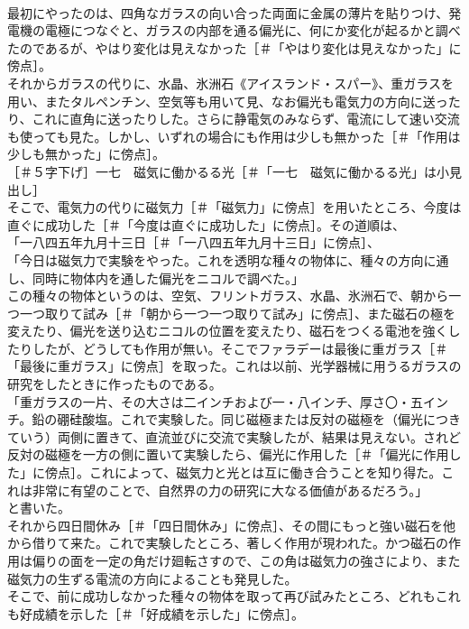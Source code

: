 \documentclass[8pt]{extreport}
\begin{document}
\begin{CJK}{UTF8}{min}
\\	最初にやったのは、四角なガラスの向い合った両面に金属の薄片を貼りつけ、発電機の電極につなぐと、ガラスの内部を通る偏光に、何にか変化が起るかと調べたのであるが、やはり変化は見えなかった［＃「やはり変化は見えなかった」に傍点］。
\\	それからガラスの代りに、水晶、氷洲石《アイスランド・スパー》、重ガラスを用い、またタルペンチン、空気等も用いて見、なお偏光も電気力の方向に送ったり、これに直角に送ったりした。さらに静電気のみならず、電流にして速い交流も使っても見た。しかし、いずれの場合にも作用は少しも無かった［＃「作用は少しも無かった」に傍点］。
\\	［＃５字下げ］一七　磁気に働かるる光［＃「一七　磁気に働かるる光」は小見出し］
\\	そこで、電気力の代りに磁気力［＃「磁気力」に傍点］を用いたところ、今度は直ぐに成功した［＃「今度は直ぐに成功した」に傍点］。その道順は、
\\	「一八四五年九月十三日［＃「一八四五年九月十三日」に傍点］、
\\	「今日は磁気力で実験をやった。これを透明な種々の物体に、種々の方向に通し、同時に物体内を通した偏光をニコルで調べた。」
\\	この種々の物体というのは、空気、フリントガラス、水晶、氷洲石で、朝から一つ一つ取りて試み［＃「朝から一つ一つ取りて試み」に傍点］、また磁石の極を変えたり、偏光を送り込むニコルの位置を変えたり、磁石をつくる電池を強くしたりしたが、どうしても作用が無い。そこでファラデーは最後に重ガラス［＃「最後に重ガラス」に傍点］を取った。これは以前、光学器械に用うるガラスの研究をしたときに作ったものである。
\\	「重ガラスの一片、その大さは二インチおよび一・八インチ、厚さ〇・五インチ。鉛の硼硅酸塩。これで実験した。同じ磁極または反対の磁極を（偏光につきていう）両側に置きて、直流並びに交流で実験したが、結果は見えない。されど反対の磁極を一方の側に置いて実験したら、偏光に作用した［＃「偏光に作用した」に傍点］。これによって、磁気力と光とは互に働き合うことを知り得た。これは非常に有望のことで、自然界の力の研究に大なる価値があるだろう。」
\\	と書いた。
\\	それから四日間休み［＃「四日間休み」に傍点］、その間にもっと強い磁石を他から借りて来た。これで実験したところ、著しく作用が現われた。かつ磁石の作用は偏りの面を一定の角だけ廻転さすので、この角は磁気力の強さにより、また磁気力の生ずる電流の方向によることも発見した。
\\	そこで、前に成功しなかった種々の物体を取って再び試みたところ、どれもこれも好成績を示した［＃「好成績を示した」に傍点］。

\end{CJK}
\end{document}
